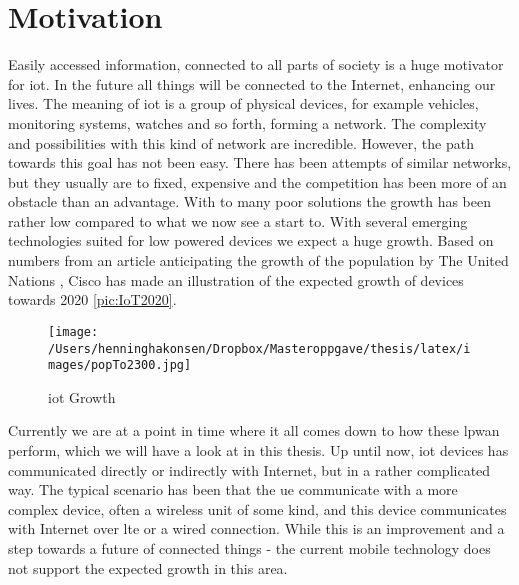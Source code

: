 \documentclass[USenglish]{ifimaster}  %
\begin{document}
\section{Motivation}
Easily accessed information, connected to all parts of society is a huge motivator for \acrfull{iot}. In the future all things will be connected to the Internet, enhancing our lives. The meaning of \acrshort{iot} is a group of physical devices, for example vehicles, monitoring systems, watches and so forth, forming a network. The complexity and possibilities with this kind of network are incredible. However, the path towards this goal has not been easy. There has been attempts of similar networks, but they usually are to fixed, expensive and the competition has been more of an obstacle than an advantage. With to many poor solutions the growth has been rather low compared to what we now see a start to. With several emerging technologies suited for low powered devices we expect a huge growth. Based on numbers from an article anticipating the growth of the population by The United Nations \cite{online:pop2300}, Cisco has made an illustration of the expected growth of devices towards 2020 \vref{pic:IoT2020}.

\begin{figure}[ht]
  \centering\texttt{[image: /Users/henninghakonsen/Dropbox/Masteroppgave/thesis/latex/images/popTo2300.jpg]}
  \caption{\acrshort{iot} Growth \cite{online:IoT2020}}
  \label{pic:IoT2020}
\end{figure}

Currently we are at a point in time where it all comes down to how these \acrfull{lpwan} perform, which we will have a look at in this thesis. Up until now, \acrshort{iot} devices has communicated directly or indirectly with Internet, but in a rather complicated way. The typical scenario has been that the \acrfull{ue} communicate with a more complex device, often a wireless unit of some kind, and this device communicates with Internet over \acrshort{lte} or a wired connection. While this is an improvement and a step towards a future of connected things - the current mobile technology does not support the expected growth in this area.
\end{document}
